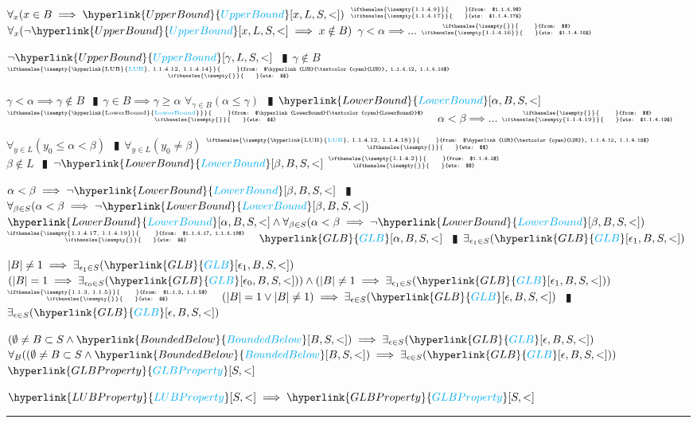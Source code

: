 \documentclass{book}
\newcommand{\rf}[1]{\hyperlink{#1}{\textcolor{cyan}{#1}}}
\newcommand{\pipe}{$\phantom{(}\vrectangleblack\phantom{)}$}
\newcommand{\ann}[2]{%
  \hfill %
  $\stackrel%
  {\hbox{\tiny{\ifthenelse{\isempty{#1}}%
    {\phantom{from}}%
    {from: $#1$}}}}%
  {\hbox{\tiny{\ifthenelse{\isempty{#2}}%
    {\phantom{wts}}%
    {wts: $#2$}}}}$%
\ }
\begin{document}
\begin{enumerate}
\begin{enumerate}
\begin{enumerate}
\begin{enumerate}
        \lit $\forall_{x}(x \in B \implies \rf{UpperBound}[x, L, S, <])$    \ann{1.1.4.9}{1.1.4.17}
        \lit $\forall_{x}(\lnot \rf{UpperBound}[x, L, S, <] \implies x \notin B)$
        \lit $\gamma < \alpha \implies \ldots$    \ann{}{1.1.4.16}
        \begin{enumerate}
          \lit $\lnot \rf{UpperBound}[\gamma, L, S, <]$ \pipe $\gamma \notin B$    \ann{\rf{LUB}, 1.1.4.12, 1.1.4.14}{}
        \end{enumerate}
        \lit $\gamma < \alpha \implies \gamma \notin B$ \pipe $\gamma \in B \implies \gamma \geq \alpha$
        \lit $\forall_{\gamma \in B}(\alpha \leq \gamma)$ \pipe $\rf{LowerBound}[\alpha, B, S, <]$    \ann{\rf{LowerBound}}{}
        \lit $\alpha < \beta \implies \ldots$    \ann{}{1.1.4.19}
        \begin{enumerate}
          \lit $\forall_{y \in L}(y_0 \leq \alpha < \beta)$ \pipe $\forall_{y \in L}(y_0 \neq \beta)$   \ann{\rf{LUB}, 1.1.4.12, 1.1.4.18}{}
          \lit $\beta \notin L$ \pipe $\lnot \rf{LowerBound}[\beta, B, S, <]$    \ann{1.1.4.2}{}
        \end{enumerate}
        \lit $\alpha < \beta \implies \lnot \rf{LowerBound}[\beta, B, S, <]$ \pipe $\forall_{\beta \in S}(\alpha < \beta \implies \lnot \rf{LowerBound}[\beta, B, S, <])$
        \lit $\rf{LowerBound}[\alpha, B, S, <] \land \forall_{\beta \in S}(\alpha < \beta \implies \lnot \rf{LowerBound}[\beta, B, S, <])$    \ann{1.1.4.17, 1.1.4.19}{}
        \lit $\rf{GLB}[\alpha, B, S, <]$ \pipe $\exists_{\epsilon_1 \in S}(\rf{GLB}[\epsilon_1, B, S, <])$
      \end{enumerate}
      \lit $|B| \neq 1 \implies \exists_{\epsilon_1 \in S}(\rf{GLB}[\epsilon_1, B, S, <])$
    \lit $(|B| = 1 \implies \exists_{\epsilon_0 \in S}(\rf{GLB}[\epsilon_0, B, S, <])) \land (|B| \neq 1 \implies \exists_{\epsilon_1 \in S}(\rf{GLB}[\epsilon_1, B, S, <]))$    \ann{1.1.3, 1.1.5}{}
    \lit $(|B| = 1 \lor |B| \neq 1) \implies \exists_{\epsilon \in S}(\rf{GLB}[\epsilon, B, S, <])$ \pipe $\exists_{\epsilon \in S}(\rf{GLB}[\epsilon, B, S, <])$
    \end{enumerate}
    \lit $(\emptyset \neq B \subset S \land \rf{BoundedBelow}[B, S, <]) \implies \exists_{\epsilon \in S}(\rf{GLB}[\epsilon, B, S, <])$
    \lit $\forall_{B}((\emptyset \neq B \subset S \land \rf{BoundedBelow}[B, S, <]) \implies \exists_{\epsilon \in S}(\rf{GLB}[\epsilon, B, S, <]))$
    \lit $\rf{GLBProperty}[S, <]$
  \end{enumerate}
  \lit $\rf{LUBProperty}[S, <] \implies \rf{GLBProperty}[S, <]$ 
\end{enumerate} \vspace{.75mm} \hrule \vspace{.75mm} \ \\
\end{document}
